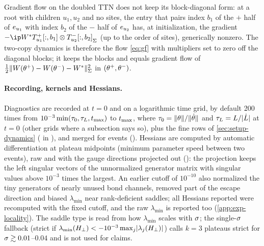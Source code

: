 \begin{remark}\label{rem:two-copy-mask}
  \proven{} Gradient flow on the doubled TTN does not keep its block-diagonal form: at a root with
  children $u_1,u_2$ and no sites, the entry that pairs index $b_1$ of the $+$ half of $e_{u_1}$
  with index $b_2$ of the $-$ half of $e_{u_2}$ has, at initialization, the gradient
  $-\ipS{\Wt}{\Sub{u_1}^+[:,b_1]\otimes\Sub{u_2}^-[:,b_2]}$ (up to the order of sites), generically
  nonzero. The two-copy dynamics is therefore the flow \eqref{eq:gf} with multipliers set to zero off
  the diagonal blocks; it keeps the blocks and equals gradient flow of
  $\tfrac12\lVert W(\theta^+)-W(\theta^-)-W^{*}\rVert_{\Sigma}^2$ in $(\theta^+,\theta^-)$.
\end{remark}

\paragraph{Recording, kernels and Hessians.}
Diagnostics are recorded at $t=0$ and on a logarithmic time grid, by default 200 times from
$10^{-3}\min(\tau_0,\tau_L,t_{\max})$ to $t_{\max}$, where $\tau_0=\lVert\theta\rVert/\lVert\dot{\theta}\rVert$ and
$\tau_L=L/\lvert\dot{L}\rvert$ at $t=0$ (other grids where a subsection says so), plus the fine rows of
\cref{sec:setup-dynamics} ( in ), and merged for events
(). Hessians are computed by automatic differentiation at plateau midpoints
(minimum parameter speed between two events), raw and with the gauge directions projected out
(): the projection keeps the left singular vectors of the
unnormalized generator matrix with singular values above $10^{-3}$ times the largest. An earlier cutoff of
$10^{-10}$ also normalized the tiny generators of nearly unused bond channels, removed part of the escape
direction and biased $\lambda_{\min}$ near rank-deficient saddles; all Hessians reported were recomputed
with the fixed cutoff, and the raw $\lambda_{\min}$ is reported too (\cref{app:exp-locality}). The saddle type is
read from how $\lambda_{\min}$ scales with $\sigma$; the single-$\sigma$ fallback (strict if
$\lambda_{\min}(H_{\perp})<-10^{-3}\max_j\lvert\lambda_j(H_{\perp})\rvert$) calls $k=3$ plateaus strict for $\sigma\gtrsim0.01$--$0.04$
and is not used for claims.

